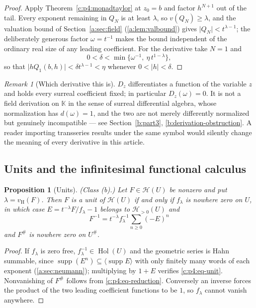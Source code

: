 \documentclass[11pt,a4paper]{article}
\numberwithin{equation}{section}
\newtheorem{proposition}[theorem]{Proposition}
\theoremstyle{definition}
\theoremstyle{remark}
\newtheorem{remark}[theorem]{Remark}
\theoremstyle{plain}
\newcommand{\K}{\mathbb K}
\DeclareMathOperator{\Hol}{Hol}
\DeclareMathOperator{\supp}{supp}
\newcommand{\tm}{t}
\newcommand{\halo}[1]{#1^{\#}}
\newcommand{\ev}[1]{#1^{\#}}
\newcommand{\Hc}{\mathcal H}
\newcommand{\vH}{v_{\mathrm H}}
\newcommand{\Neu}[1]{\langle #1\rangle}
\newcommand{\abs}[1]{\lvert #1\rvert}
\begin{document}
\begin{proof}
Apply Theorem~\ref{c:p4:monadtaylor} at $z_0=b$ and factor $h^{N+1}$
out of the tail. Every exponent remaining in $Q_N$ is at least
$\lambda$, so $v(Q_N)\ge\lambda$, and the valuation bound of
Section~\ref{a:sec:field} (\ref{a:lem:valbound}) gives
$\abs{Q_N}<\tm^{\lambda-1}$; the deliberately generous factor
$\omega=\tm^{-1}$ makes the bound independent of the ordinary real size
of any leading coefficient. For the derivative take $N=1$ and
\[
 0<\delta<\min\{\omega^{-1},\ \eta\,\tm^{1-\lambda}\},
\]
so that $\abs{hQ_1(b,h)}<\delta\tm^{\lambda-1}<\eta$ whenever
$0<\abs h<\delta$.
\end{proof}

\begin{remark}[Which derivative this is]\label{c:p4:rk-deriv}
$D_z$ differentiates a function of the variable $z$ and holds every
surreal coefficient fixed; in particular $D_z(\omega)=0$. It is not a
field derivation on $\K$ in the sense of surreal differential algebra,
whose normalization has $d(\omega)=1$, and the two are not merely
differently normalized but genuinely incompatible --- see
Section~\ref{b:part3}, \ref{b:derivation-obstruction}. A reader importing
transseries results under the same symbol would silently change the
meaning of every derivative in this article.
\end{remark}

\subsection{Units and the infinitesimal functional calculus}
\label{c:p4:units}

\begin{proposition}[Units]\label{c:p4:prop-units}
\emph{(Class (b).)} Let $F\in\Hc(U)$ be nonzero and put $\lambda=\vH(F)$.
Then $F$ is a unit of $\Hc(U)$ if and only if
$f_\lambda$ is nowhere zero on $U$, in which case $E=\tm^{-\lambda}F/f_\lambda-1$ belongs to
$\Hc_{>0}(U)$ and
\begin{equation}\label{c:p4:eq-unit}
 F^{-1}=\tm^{-\lambda}f_\lambda^{-1}\sum_{n\ge0}(-E)^n
\end{equation}
and $\ev F$ is nowhere zero on $\halo U$.
\end{proposition}

\begin{proof}
If $f_\lambda$ is zero free, $f_\lambda^{-1}\in\Hol(U)$ and the
geometric series is Hahn summable, since $\supp(E^n)\subseteq\Neu{\supp
E}$ with only finitely many words of each exponent
(\ref{a:sec:neumann}); multiplying by $1+E$ verifies
\eqref{c:p4:eq-unit}. Nonvanishing of $\ev F$ follows from
\eqref{c:p4:eq-reduction}. Conversely an inverse forces the product of
the two leading coefficient functions to be $1$, so $f_\lambda$ cannot
vanish anywhere.
\end{proof}
\end{document}

